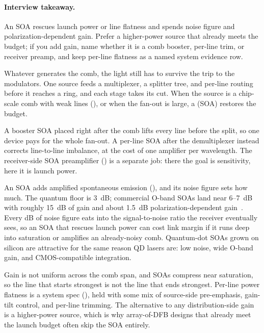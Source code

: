 \paragraph{Interview takeaway.}
An SOA rescues launch power or line flatness and spends noise figure and
polarization-dependent gain. Prefer a higher-power source that already meets the
budget; if you add gain, name whether it is a comb booster, per-line trim, or
receiver preamp, and keep per-line flatness as a named system evidence row.

Whatever generates the comb, the light still has to survive the trip to the
modulators. One source feeds a multiplexer, a splitter tree, and per-line routing
before it reaches a ring, and each stage takes its cut. When the source is a
chip-scale comb with weak lines (), or when the fan-out is
large, a  (SOA) restores the budget.

 A booster SOA placed right after the comb lifts
every line before the split, so one device pays for the whole fan-out. A per-line
SOA after the demultiplexer instead corrects line-to-line imbalance, at the cost of
one amplifier per wavelength. The receiver-side SOA preamplifier
() is a separate job: there the goal is sensitivity, here it is
launch power.

 An SOA adds amplified spontaneous emission
(), and its noise figure sets how much. The quantum floor is 3~dB;
commercial O-band SOAs land near 6--7~dB with roughly 15~dB of gain and about
1.5~dB polarization-dependent gain~. Every dB of noise figure eats
into the signal-to-noise ratio the receiver eventually sees, so an SOA that rescues
launch power can cost link margin if it runs deep into saturation or amplifies an
already-noisy comb. Quantum-dot SOAs grown on silicon are attractive for the same
reason QD lasers are: low noise, wide O-band gain, and CMOS-compatible integration.

 Gain is not uniform across the comb span, and
SOAs compress near saturation, so the line that starts strongest is not the line
that ends strongest. Per-line power flatness is a system spec (),
held with some mix of source-side pre-emphasis, gain-tilt control, and per-line
trimming. The alternative to any distribution-side gain is a higher-power source,
which is why array-of-DFB designs that already meet the launch budget often skip
the SOA entirely.

